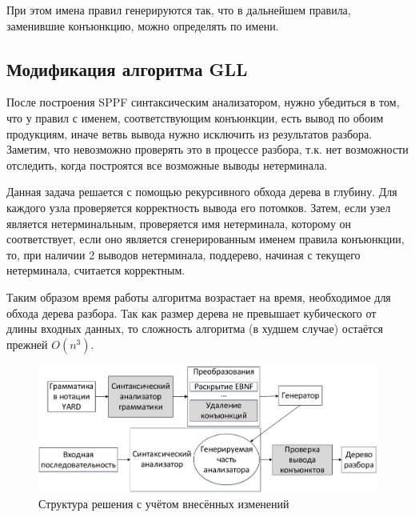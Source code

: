 При этом имена правил генерируются так, что в дальнейшем правила, заменившие конъюнкцию, можно определять по имени.

\subsection{Модификация алгоритма GLL}

После построения SPPF синтаксическим анализатором, нужно убедиться в том, что у правил с именем, соответствующим конъюнкции, есть вывод по обоим продукциям, иначе ветвь вывода нужно исключить из результатов разбора. Заметим, что невозможно проверять это в процессе разбора, т.к. нет возможности отследить, когда построятся все возможные выводы нетерминала.

Данная задача решается с помощью рекурсивного обхода дерева в глубину. Для каждого узла проверяется корректность вывода его потомков. Затем, если узел является нетерминальным, проверяется имя нетерминала, которому он соответствует, если оно является сгенерированным именем правила конъюнкции, то, при наличии 2 выводов нетерминала, поддерево, начиная с текущего нетерминала, считается корректным.

Таким образом время работы алгоритма возрастает на время, необходимое для обхода дерева разбора. Так как размер дерева не превышает кубического от длины входных данных, то сложность алгоритма (в худшем случае) остаётся прежней $O(n^3)$.


\begin{figure}
\centering
\includegraphics[width=\textwidth]{Gorokhov/courseworkpictures/img3.pdf}
\caption{Структура решения с учётом внесённых изменений}
\label{structure}
\end{figure}